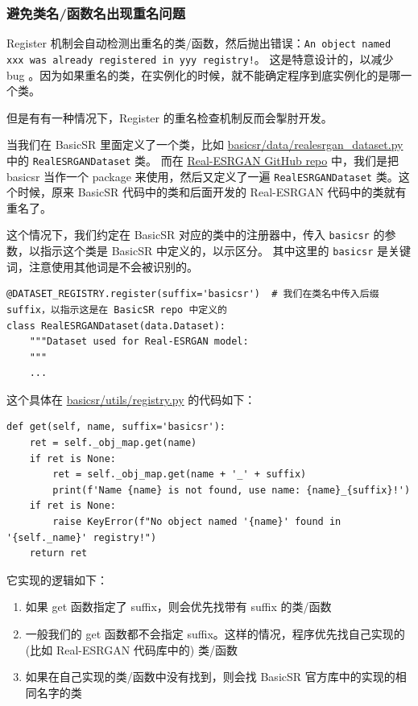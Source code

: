 \documentclass[../main.tex]{subfiles}
\begin{document}
\subsubsection{避免类名/函数名出现重名问题}\label{code_structure:avoid_repeated_name}

Register 机制会自动检测出重名的类/函数，然后抛出错误：\texttt{An object named xxx was already registered in yyy registry!}。
这是特意设计的，以减少 bug 。因为如果重名的类，在实例化的时候，就不能确定程序到底实例化的是哪一个类。

但是有有一种情况下，Register 的重名检查机制反而会掣肘开发。

当我们在 BasicSR 里面定义了一个类，比如 \href{https://github.com/XPixelGroup/BasicSR/blob/master/basicsr/data/realesrgan\_dataset.py}{basicsr/data/realesrgan\_dataset.py} 中的 \texttt{RealESRGANDataset} 类。
而在 \href{https://github.com/xinntao/Real-ESRGAN}{Real-ESRGAN GitHub repo} 中，我们是把 basicsr 当作一个 package 来使用，然后又定义了一遍 \texttt{RealESRGANDataset} 类。这个时候，原来 BasicSR 代码中的类和后面开发的 Real-ESRGAN 代码中的类就有重名了。

这个情况下，我们约定在 BasicSR 对应的类中的注册器中，传入 \texttt{basicsr} 的参数，以指示这个类是 BasicSR 中定义的，以示区分。
其中这里的 \texttt{basicsr} 是关键词，注意使用其他词是不会被识别的。
\begin{verbatim}
@DATASET_REGISTRY.register(suffix='basicsr')  # 我们在类名中传入后缀 suffix，以指示这是在 BasicSR repo 中定义的
class RealESRGANDataset(data.Dataset):
    """Dataset used for Real-ESRGAN model:
    """
    ...
\end{verbatim}

这个具体在 \href{https://github.com/XPixelGroup/BasicSR/blob/master/basicsr/utils/registry.py}{basicsr/utils/registry.py} 的代码如下：
\begin{verbatim}
def get(self, name, suffix='basicsr'):
    ret = self._obj_map.get(name)
    if ret is None:
        ret = self._obj_map.get(name + '_' + suffix)
        print(f'Name {name} is not found, use name: {name}_{suffix}!')
    if ret is None:
        raise KeyError(f"No object named '{name}' found in '{self._name}' registry!")
    return ret
\end{verbatim}
它实现的逻辑如下：
\begin{enumerate}
    \item 如果 get 函数指定了 suffix，则会优先找带有 suffix 的类/函数
    \item 一般我们的 get 函数都不会指定 suffix。这样的情况，程序优先找自己实现的 (比如 Real-ESRGAN 代码库中的) 类/函数
    \item 如果在自己实现的类/函数中没有找到，则会找 BasicSR 官方库中的实现的相同名字的类
\end{enumerate}
\end{document}
